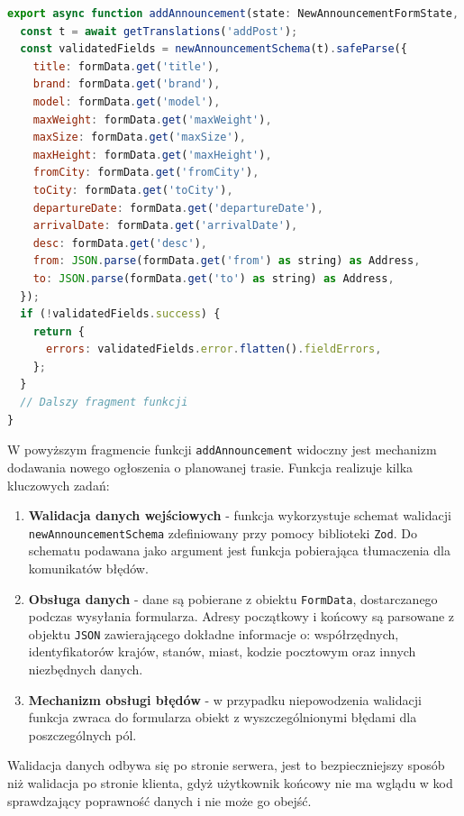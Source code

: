 {\belowcaptionskip=-9pt
\begin{lstlisting}[language=JavaScript,caption=Wstępna walidacja danych przed dodaniem ogłoszenia do bazy danych, label=lst:addAnnouncement]
export async function addAnnouncement(state: NewAnnouncementFormState, formData: FormData) {
  const t = await getTranslations('addPost');
  const validatedFields = newAnnouncementSchema(t).safeParse({
    title: formData.get('title'),
    brand: formData.get('brand'),
    model: formData.get('model'),
    maxWeight: formData.get('maxWeight'),
    maxSize: formData.get('maxSize'),
    maxHeight: formData.get('maxHeight'),
    fromCity: formData.get('fromCity'),
    toCity: formData.get('toCity'),
    departureDate: formData.get('departureDate'),
    arrivalDate: formData.get('arrivalDate'),
    desc: formData.get('desc'),
    from: JSON.parse(formData.get('from') as string) as Address,
    to: JSON.parse(formData.get('to') as string) as Address,
  });
  if (!validatedFields.success) {
    return {
      errors: validatedFields.error.flatten().fieldErrors,
    };
  }
  // Dalszy fragment funkcji
}
\end{lstlisting}
}

W powyższym fragmencie funkcji \texttt{addAnnouncement} widoczny jest mechanizm dodawania nowego ogłoszenia o planowanej trasie. Funkcja realizuje kilka kluczowych zadań:
\begin{enumerate}
    \item \textbf{Walidacja danych wejściowych} - funkcja wykorzystuje schemat walidacji \texttt{newAnnouncementSchema} zdefiniowany przy pomocy biblioteki \texttt{Zod}. Do schematu podawana jako argument jest funkcja pobierająca tłumaczenia dla komunikatów błędów.
    \item \textbf{Obsługa danych} - dane są pobierane z obiektu \texttt{FormData}, dostarczanego podczas wysyłania formularza. Adresy początkowy i końcowy są parsowane z objektu \texttt{JSON} zawierającego dokładne informacje o: współrzędnych, identyfikatorów krajów, stanów, miast, kodzie pocztowym oraz innych niezbędnych danych.
    \item \textbf{Mechanizm obsługi błędów} - w przypadku niepowodzenia walidacji funkcja zwraca do formularza obiekt z wyszczególnionymi błędami dla poszczególnych pól.
\end{enumerate}

Walidacja danych odbywa się po stronie serwera, jest to bezpieczniejszy sposób niż walidacja po stronie klienta, gdyż użytkownik końcowy nie ma wglądu w kod sprawdzający poprawność danych i nie może go obejść.

